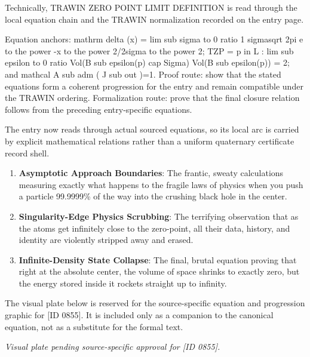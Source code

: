 Technically, TRAWIN ZERO POINT LIMIT DEFINITION is read through the local equation chain and the TRAWIN normalization recorded on the entry page.

Equation anchors: mathrm delta (x) = lim sub sigma to 0 ratio 1 sigmasqrt 2pi e to the power -x to the power 2/2sigma to the power 2; TZP = p in L : lim sub epsilon to 0 ratio Vol(B sub epsilon(p) cap Sigma) Vol(B sub epsilon(p)) = 2; and mathcal A sub adm ( J sub out )=1. Proof route: show that the stated equations form a coherent progression for the entry and remain compatible under the TRAWIN ordering. Formalization route: prove that the final closure relation follows from the preceding entry-specific equations.

The entry now reads through actual sourced equations, so its local arc is carried by explicit mathematical relations rather than a uniform quaternary certificate record shell.
\endgroup

\begin{enumerate}[leftmargin=1.6em,itemsep=6pt,topsep=4pt]
\item \textbf{Asymptotic Approach Boundaries}: The frantic, sweaty calculations measuring exactly what happens to the fragile laws of physics when you push a particle 99.9999\% of the way into the crushing black hole in the center.
\item \textbf{Singularity-Edge Physics Scrubbing}: The terrifying observation that as the atoms get infinitely close to the zero-point, all their data, history, and identity are violently stripped away and erased.
\item \textbf{Infinite-Density State Collapse}: The final, brutal equation proving that right at the absolute center, the volume of space shrinks to exactly zero, but the energy stored inside it rockets straight up to infinity.
\end{enumerate}

\begingroup\footnotesize\sloppy
The visual plate below is reserved for the source-specific equation and progression graphic for [ID 0855]. It is included only as a companion to the canonical equation, not as a substitute for the formal text.
\par\endgroup
\begingroup\footnotesize\itshape
Visual plate pending source-specific approval for [ID 0855].
\par\endgroup

